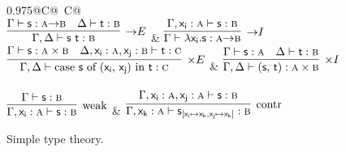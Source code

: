 \begin{figure}
	\centering
	\begin{tabularx}{0.975\textwidth}{@{}C@{~}C@{}}
		\\[2em]
		$\infer[\ii E]{\Gamma, \Delta \vdash \term{s~t} : \prop B}{\Gamma \vdash \term{s} : \prop A \ii \prop B & \Delta \vdash \term{t} : \prop B}$ 
		& 
		$\infer[\ii I]{\Gamma \vdash \term{\lambda x_i.s} : \prop A \ii \prop B}{\Gamma, \term{x_i}: \prop A \vdash \term{s}:\prop B}$\\[2em]
		$\infer[\times E]
			{\Gamma,\Delta \vdash
			 \cterm{case \term{s} of (\term{x_i}, \term{x_j}) in \term{t}} 
			 : \prop{C}}
			{\Gamma \vdash \term{s}: \prop A \times \prop B & 
			\Delta, \term{x_i}: \prop A , \term{x_j}: \prop B \vdash \term{t}: \prop{C}}$ 
		&
		$\infer[\times I]
			{\Gamma, \Delta \vdash \cterm{(\term{s}, \term{t})}: \prop{A} \times \prop{B}}
			{\Gamma \vdash \term{s}: \prop{A} & \Delta \vdash \term{t}:\prop{B}}$\\[\smallsep]
		\\[2em]
		$\infer[\Weakening{}]
			{\Gamma, \term{x_i}: \prop{A} \vdash \term{s}: \prop{B}}
			{\Gamma \vdash \term{s}:\prop{B}} $ 
		&
		$\infer[\Contraction{}]
			{\Gamma, \term{x_k}: \prop{A} \vdash \term{s}_{[\term{x_i} \mapsto \term{x_k}, \term{x_j} \mapsto \term{x_k}]}:\prop{B}}
			{\Gamma,  \term{x_i}: \prop{A}, \term{x_j}: \prop{A} \vdash \term{s}: \prop{B}}$
		\end{tabularx}
	\caption{Simple type theory.}
	\label{figure:simple_type_theory}
\end{figure}

